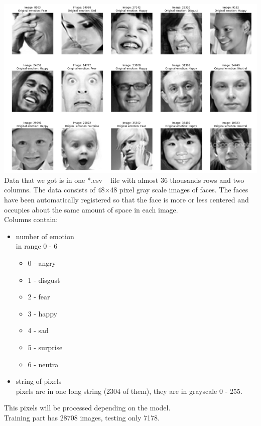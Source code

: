 \includegraphics[scale=0.75]{images/ferCover.png}
\\Data that we got is in one *.csv ~\cite{kaggleFER} file with almost 36 thousands rows and two columns. The data consists of 48×48 pixel gray scale images of faces. The faces have been automatically registered so that the face is more or less centered and occupies about the same amount of space in each image.
\\Columns contain:
\begin{itemize}
  \item number of emotion \\
        in range 0 - 6
        \begin{itemize}
          \item 0 - angry
          \item 1 - disgust
          \item 2 - fear
          \item 3 - happy
          \item 4 - sad
          \item 5 - surprise
          \item 6 - neutra
        \end{itemize}
  \item string of pixels \\
        pixels are in one long string (2304 of them), they are in grayscale 0 - 255.\\
\end{itemize}
This pixels will be processed depending on the model.\\
Training part has 28708 images, testing only 7178.